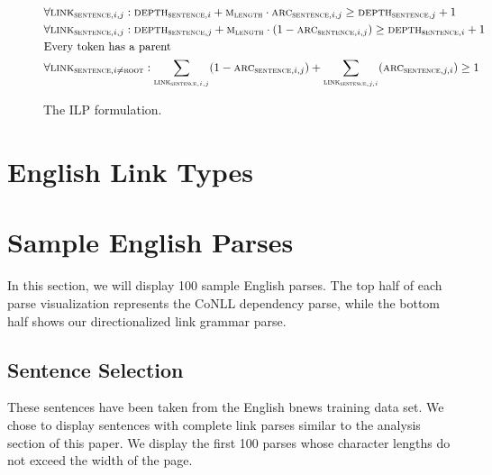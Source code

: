 \documentclass[11pt]{article}
\begin{document}
\begin{figure}[!htb]
\begin{align*}
    &\forall{\textsc{link}_{\textsc{sentence},i,j}}: \textsc{depth}_{\textsc{sentence},i} + \textsc{m}_\textsc{length}\cdot\textsc{arc}_{\textsc{sentence},i,j} \geq \textsc{depth}_{\textsc{sentence},j} + 1 &\\
    &\forall{\textsc{link}_{\textsc{sentence},i,j}}: \textsc{depth}_{\textsc{sentence},j} + \textsc{m}_\textsc{length}\cdot(1-\textsc{arc}_{\textsc{sentence},i,j}) \geq \textsc{depth}_{\textsc{sentence},i} + 1 &\\
    &\text{Every token has a parent}&\\
    &\forall{\textsc{link}_{\textsc{sentence},i \neq \textsc{root}}}: \sum_{\textsc{link}_{\textsc{sentence},i,j}} (1-\textsc{arc}_{\textsc{sentence},i,j}) + \sum_{\textsc{link}_{\textsc{sentence},j,i}}(\textsc{arc}_{\textsc{sentence},j,i}) \geq 1&\\
  \end{align*}
  \caption{\small The ILP formulation.}
\end{figure}


\clearpage

\section{English Link Types}









\section{Sample English Parses}
In this section, we will display 100 sample English parses. The top half of each parse visualization represents the CoNLL dependency parse, while the bottom half shows our directionalized link grammar parse. 

\subsection{Sentence Selection}
These sentences have been taken from the English bnews training data set. We chose to display sentences with complete link parses similar to the analysis section of this paper. We display the first 100 parses whose character lengths do not exceed the width of the page.
\end{document}
